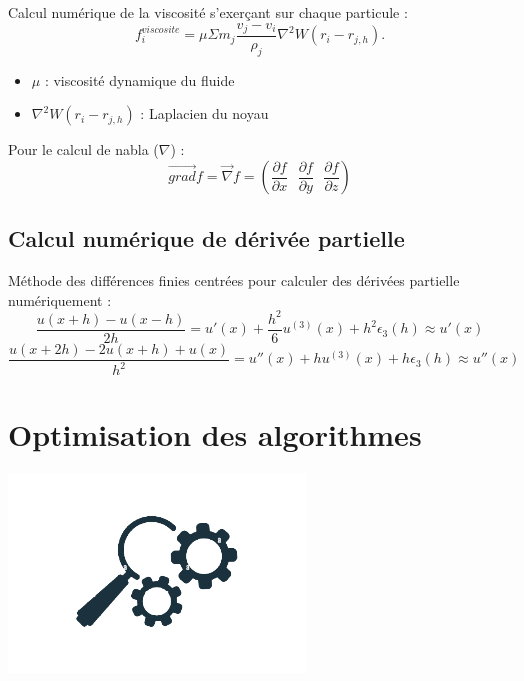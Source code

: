 \documentclass{article}
\begin{document}
\newpage
\vspace*{2pt}
\thispagestyle{landscape}
Calcul numérique de la viscosité s’exerçant sur chaque particule :
$$ f^{viscosite}_i = \mu \Sigma m_j \frac{v_j-v_i}{\rho_j} \nabla ^2 W(r_i- r_{j,h}).$$
\begin{itemize}
    \item $\mu$ : viscosité dynamique du fluide 
    \item $\nabla ^2 W(r_i- r_{j,h})$ : Laplacien du noyau 
\end{itemize}

\newpage
\vspace*{2pt}
\thispagestyle{landscape}
Pour le calcul de nabla ($\nabla$) :
$$\vec{grad} f = \vec{\nabla} f = (\frac{\partial f}{\partial x}\,\,\,\,\frac{\partial f}{\partial y}\,\,\,\,\frac{\partial f}{\partial z})$$

\newpage
\vspace*{2pt}
\thispagestyle{landscape}
\subsection{Calcul numérique de dérivée partielle}
Méthode des différences finies centrées pour calculer des dérivées partielle numériquement :\\
$$ \frac{u(x+h)-u(x-h)}{2h} = u'(x)+\frac{h^2}{6}u^{(3)}(x)+h^2 \epsilon_3(h) \approx u'(x)$$
$$\frac{u(x+2h)-2u(x+h)+u(x)}{h^2} = u''(x)+hu^{(3)}(x)+h\epsilon_3(h) \approx u''(x)$$



\newpage
\vspace*{2pt}
\thispagestyle{landscape}
\section{Optimisation des algorithmes}
\begin{center}
    \includegraphics{Optimisation.png}
\end{center}
\end{document}
